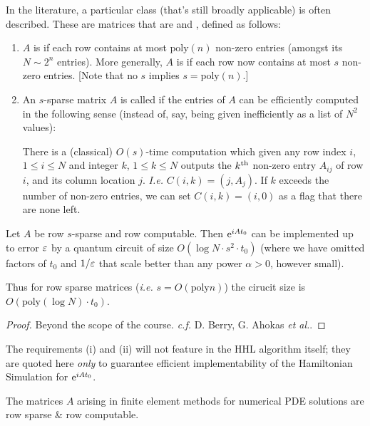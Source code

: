 \documentclass[]{article}
\renewcommand{\it}[1]{\textit{#1}}
\newcommand{\poly}{\textrm{poly}}
\begin{document}
In the literature, a particular class (that's still broadly applicable) is often described. These are matrices that are  and , defined as follows:

\begin{enumerate}[label = (\roman*)]
	\item $A$ is  if each row contains at most $\poly(n)$ non-zero entries (amongst its $N \sim 2^n$ entries). More generally, $A$ is  if each row now contains at most $s$ non-zero entries. [Note that no $s$ implies $s = \poly(n)$.]
	\item An $s$-sparse matrix $A$ is called  if the entries of $A$ can be efficiently computed in the following sense (instead of, say, being given inefficiently as a list of $N^2$ values):
	
	There is a (classical) $O(s)$-time computation which given any row index $i$, $1\le i\le N$ and integer $k$, $1\le k \le N$ outputs the $k^{\textrm{th}}$ non-zero entry $A_{ij}$ of row $i$, and its column location $j$. \it{I.e.} $C(i,k) = (j,A_j)$. If $k$ exceeds the number of non-zero entries, we can set $C(i,k) = (i,0)$ as a flag that there are none left.
\end{enumerate}


\begin{theorem*}
	Let $A$ be row $s$-sparse and row computable. Then $\mathrm{e}^{iAt_0}$ can be implemented up to error $\varepsilon$ by a quantum circuit of size $O(\log N \cdot s^2 \cdot t_0)$ (where we have omitted factors of $t_0$ and $1/\varepsilon$ that scale better than any power $\alpha > 0$, however small).

	Thus for row sparse matrices (\it{i.e.} $s = O(\poly n)$) the cirucit size is $O(\poly(\log N)\cdot t_0)$.
\end{theorem*}
\begin{proof}
	Beyond the scope of the course. \it{c.f.} D. Berry, G. Ahokas \it{et al.}.
\end{proof}
\begin{remark*}
	The requirements (i) and (ii) will not feature in the HHL algorithm itself; they are quoted here \it{only} to guarantee efficient implementability of the Hamiltonian Simulation for $\mathrm{e}^{iAt_0}$.
\end{remark*}

\begin{remark*}
	The matrices $A$ arising in finite element methods for numerical PDE solutions are row sparse \& row computable.
\end{remark*}
\end{document}
